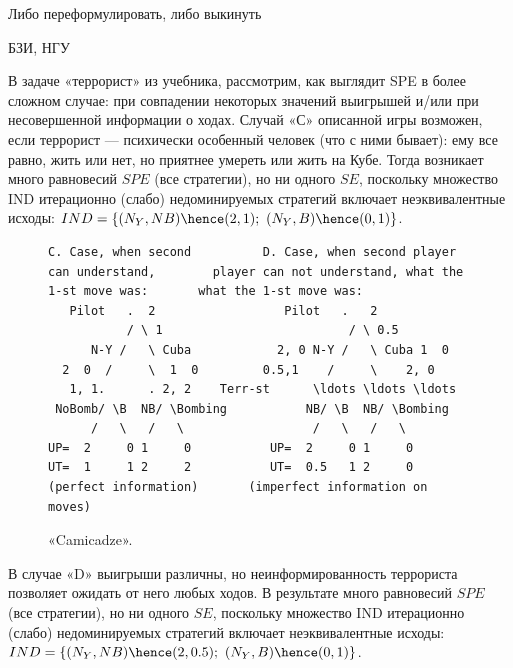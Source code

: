 \begin{problem}{\red Либо переформулировать, либо выкинуть}
\begin{source}
БЗИ, НГУ
\end{source}
 {\rm В задаче «террорист» из учебника,
рассмотрим, как выглядит SPE в более сложном случае: при
совпадении некоторых значений выигрышей и/или при
несовершенной информации о ходах. Случай «С» описанной
игры возможен, если террорист — психически особенный
человек (что с ними бывает): ему все равно, жить или нет,
но приятнее умереть или жить на Кубе. Тогда возникает много
равновесий $SPE$ (все стратегии), но ни одного $SE$,
поскольку множество IND итерационно (слабо) недоминируемых
стратегий включает неэквивалентные исходы: $IND=\{
(N_Y,NB)\hence (2,1);~ (N_Y,B)\hence (0,1)\}$.

\begin{figure}[h]

\begin{verbatim}
C. Case, when second          D. Case, when second player
can understand,        player can not understand, what the
1-st move was:       what the 1-st move was:
   Pilot   .  2                  Pilot   .   2
           / \ 1                          / \ 0.5
      N-Y /   \ Cuba            2, 0 N-Y /   \ Cuba 1  0
  2  0  /     \  1  0         0.5,1    /     \    2, 0
   1, 1.      . 2, 2    Terr-st      \ldots \ldots \ldots
 NoBomb/ \B  NB/ \Bombing           NB/ \B  NB/ \Bombing
      /   \   /   \                  /   \   /   \
UP=  2     0 1     0           UP=  2     0 1     0
UT=  1     1 2     2           UT=  0.5   1 2     0
(perfect information)       (imperfect information on moves)
\end{verbatim}

\caption{«Camicadze».}
\end{figure}

В случае «D» выигрыши различны, но неинформированность
террориста позволяет ожидать от него любых ходов. В
результате много равновесий $SPE$ (все стратегии), но ни
одного $SE$, поскольку множество IND итерационно (слабо)
недоминируемых стратегий включает неэквивалентные исходы:
$IND=\{ (N_Y,NB)\hence (2,0.5);~ (N_Y,B)\hence (0,1)\}$.}






\begin{sol}

\end{sol}
\end{problem}




















